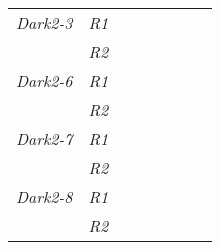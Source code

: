 \begin{table}[h]
\begin{tabular}{@{}|l|l|llllll@{}}
\textit{Dark2-3}     & \textit{R1}          &                                         &                                        &                                         & \multicolumn{1}{l|}{}                       & \multicolumn{1}{l|}{} &                                          \\ \cmidrule(lr){2-2}
                     & \textit{R2}          &                                         &                                        &                                         &                                             &                       &                                          \\ \cmidrule(r){1-2}
\textit{Dark2-6}     & \textit{R1}          &                                         &                                        &                                         & \multicolumn{1}{l|}{}                       & \multicolumn{1}{l|}{} &                                          \\ \cmidrule(lr){2-2}
                     & \textit{R2}          &                                         &                                        &                                         &                                             &                       &                                          \\ \cmidrule(r){1-2}
\textit{Dark2-7}     & \textit{R1}          &                                         &                                        &                                         & \multicolumn{1}{l|}{}                       & \multicolumn{1}{l|}{} &                                          \\ \cmidrule(lr){2-2}
                     & \textit{R2}          &                                         &                                        &                                         &                                             &                       &                                          \\ \cmidrule(r){1-2}
\textit{Dark2-8}     & \textit{R1}          &                                         &                                        &                                         & \multicolumn{1}{l|}{}                       & \multicolumn{1}{l|}{} &                                          \\ \cmidrule(lr){2-2} \cmidrule(l){7-8} 
                     & \textit{R2}          &                                         &                                        &                                         &                                             &                       &                                          \\ \cmidrule(r){1-2}
\end{tabular}
\end{table}



